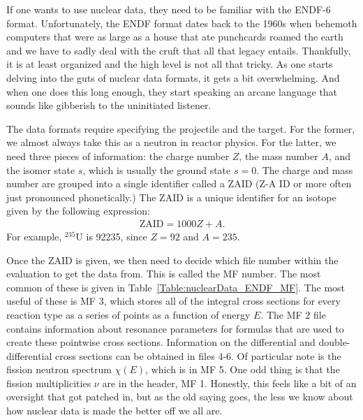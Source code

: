 If one wants to use nuclear data, they need to be familiar with the ENDF-6 format. Unfortunately, the ENDF format dates back to the 1960s when behemoth computers that were as large as a house that ate punchcards roamed the earth and we have to sadly deal with the cruft that all that legacy entails. Thankfully, it is at least organized and the high level is not all that tricky. As one starts delving into the guts of nuclear data formats, it gets a bit overwhelming. And when one does this long enough, they start speaking an arcane language that sounds like gibberish to the uninitiated listener.

The data formats require specifying the projectile and the target. For the former, we almost always take this as a neutron in reactor physics. For the latter, we need three pieces of information: the charge number $Z$, the mass number $A$, and the isomer state $s$, which is usually the ground state $s = 0$. The charge and mass number are grouped into a single identifier called a ZAID (Z-A ID or more often just pronounced phonetically.) The ZAID is a unique identifier for an isotope given by the following expression:
\begin{align}
  \text{ZAID} = 1000 Z + A .
\end{align}
For example, $^{235}$U is 92235, since $Z = 92$ and $A = 235$.

Once the ZAID is given, we then need to decide which file number within the evaluation to get the data from. This is called the MF number. The most common of these is given in Table~\ref{Table:nuclearData_ENDF_MF}. The most useful of these is MF 3, which stores all of the integral cross sections for every reaction type as a series of points as a function of energy $E$. The MF 2 file contains information about resonance parameters for formulas that are used to create these pointwise cross sections. Information on the differential and double-differential cross sections can be obtained in files 4-6. Of particular note is the fission neutron spectrum $\chi(E)$, which is in MF 5. One odd thing is that the fission multiplicities $\nu$ are in the header, MF 1. Honestly, this feels like a bit of an oversight that got patched in, but as the old saying goes, the less we know about how nuclear data is made the better off we all are.

